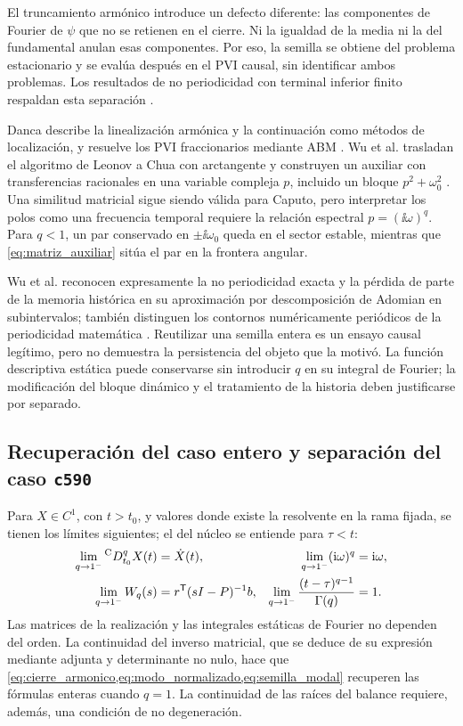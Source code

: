 El truncamiento armónico introduce un defecto diferente: las componentes
de Fourier de \(\psi\) que no se retienen en el cierre. Ni la igualdad
de la media ni la del fundamental anulan esas componentes. Por eso, la
semilla se obtiene del problema estacionario y se evalúa después en el
PVI causal, sin identificar ambos problemas. Los resultados de
no periodicidad con terminal inferior finito respaldan esta separación
\cite{TavazoeiHaeri2009,AreaLosadaNieto2014}.

Danca describe la linealización armónica y la continuación como métodos
de localización, y resuelve los PVI fraccionarios mediante ABM
\cite{Danca2017}. Wu et al. trasladan el algoritmo de Leonov a Chua
con arctangente y construyen un auxiliar con transferencias racionales
en una variable compleja \(p\), incluido un bloque
\(p^2+\omega_0^2\) \cite{Wu2023ArctanChua}. Una similitud matricial
sigue siendo válida para Caputo, pero interpretar los polos como una
frecuencia temporal requiere la relación espectral
\(p=(\ii\omega)^q\). Para \(q<1\), un par conservado en
\(\pm\ii\omega_0\) queda en el sector estable, mientras que
\cref{eq:matriz_auxiliar} sitúa el par en la frontera angular.

Wu et al. reconocen expresamente la no periodicidad exacta y la pérdida
de parte de la memoria histórica en su aproximación por descomposición
de Adomian en subintervalos; también distinguen los contornos
numéricamente periódicos de la periodicidad matemática
\cite{Wu2023ArctanChua}. Reutilizar una semilla entera es un ensayo
causal legítimo, pero no demuestra la persistencia del objeto que la
motivó. La función descriptiva estática puede conservarse sin introducir
\(q\) en su integral de Fourier; la modificación del bloque dinámico
y el tratamiento de la historia deben justificarse por separado.

\subsection{Recuperación del caso entero y separación del caso \texttt{c590}}

Para \(X\in C^1\), con \(t>t_0\), y valores donde existe la resolvente
en la rama fijada, se tienen los límites siguientes; el del núcleo se
entiende para \(\tau<t\):
\begin{equation}
\begin{aligned}
\lim_{q\to1^-}{}^{\mathrm C}D_{t_0}^{q}X(t)&=\dot X(t),&
\lim_{q\to1^-}(\mathrm{i}\omega)^q&=\mathrm{i}\omega,\\
\lim_{q\to1^-}W_q(s)
&=r^{\mathsf T}(sI-P)^{-1}b,&
\lim_{q\to1^-}\frac{(t-\tau)^{q-1}}{\Gamma(q)}&=1.
\end{aligned}
\label{eq:limite_q_uno}
\end{equation}
Las matrices de la realización y las integrales estáticas de Fourier no
dependen del orden. La continuidad del inverso matricial, que se deduce
de su expresión mediante adjunta y determinante no nulo, hace que
\cref{eq:cierre_armonico,eq:modo_normalizado,eq:semilla_modal} recuperen
las fórmulas enteras cuando \(q=1\). La continuidad de las raíces del
balance requiere, además, una condición de no degeneración.

